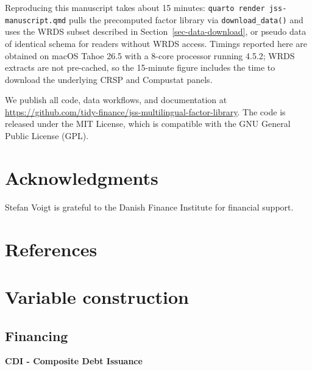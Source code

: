 \documentclass[
  article]{jss}
\begin{document}
Reproducing this manuscript takes about 15 minutes:
\texttt{quarto\ render\ jss-manuscript.qmd} pulls the precomputed factor
library via \texttt{download\_data()} and uses the WRDS subset described
in Section~\ref{sec-data-download}, or pseudo data of identical schema
for readers without WRDS access. Timings reported here are obtained on
macOS Tahoe 26.5 with a 8-core processor running  4.5.2;
WRDS extracts are not pre-cached, so the 15-minute figure includes the
time to download the underlying CRSP and Compustat panels.

We publish all code, data workflows, and documentation at
\url{https://github.com/tidy-finance/jss-multilingual-factor-library}.
The code is released under the MIT License, which is compatible with the
GNU General Public License (GPL).

\section*{Acknowledgments}\label{acknowledgments}

Stefan Voigt is grateful to the Danish Finance Institute for financial
support.

\section*{References}\label{references}

\renewcommand{\bibsection}{}


\newpage{}

\newpage 
\setcounter{section}{0}
\renewcommand{\thesection}{A-\arabic{section}}
\setcounter{subsection}{0}
\renewcommand{\thesubsection}{A-\arabic{section}.\arabic{subsection}}
\setcounter{table}{0}
\renewcommand{\thetable}{A-\arabic{table}}
\setcounter{figure}{0}
\renewcommand{\thefigure}{A-\arabic{figure}}

\section{Variable construction}\label{sec-variable-details}

\subsection{Financing}\label{financing}

\textbf{CDI - Composite Debt Issuance}
\end{document}
